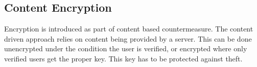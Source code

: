 \subsection{Content Encryption} \label{subsection:counter-replace-encryption}
Encryption is introduced as part of content based countermeasure.
The content driven approach relies on content being provided by a server.
This can be done unencrypted under the condition the user is verified, or encrypted where only verified users get the proper key.
This key has to be protected against theft.
